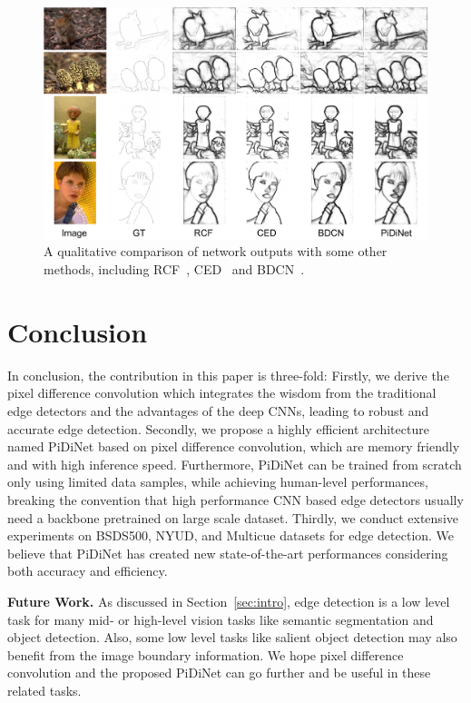 \documentclass[10pt,twocolumn,letterpaper]{article}
\begin{document}
\begin{figure}[t!]
    \centering
    \includegraphics[width=1\linewidth]{images/vis3.pdf}
    \caption{A qualitative comparison of network outputs with some other methods, including RCF~\cite{liu2019richer}, CED~\cite{wang2017ced} and BDCN~\cite{he2019bidirectional}.}
    \label{fig:bsds_visualization}
\end{figure}


\section{Conclusion}
In conclusion, the contribution in this paper is three-fold: Firstly, we derive the pixel difference convolution which integrates the wisdom from the traditional edge detectors and the advantages of the deep CNNs, leading to robust and accurate edge detection. Secondly, we propose a highly efficient architecture named PiDiNet based on pixel difference convolution, which are memory friendly and with high inference speed. Furthermore, PiDiNet can be trained from scratch only using limited data samples, while achieving human-level performances, breaking the convention that high performance CNN based edge detectors usually need a backbone pretrained on large scale dataset. Thirdly, we conduct extensive experiments on BSDS500, NYUD, and Multicue datasets for edge detection. We believe that PiDiNet has created new state-of-the-art performances considering both accuracy and efficiency.

\vspace{0.5em}
\noindent \textbf{Future Work.} \quad As discussed in Section~\ref{sec:intro}, edge detection is a low level task for many mid- or high-level vision tasks like semantic segmentation and object detection. Also, some low level tasks like salient object detection may also benefit from the image boundary information. We hope pixel difference convolution and the proposed PiDiNet can go further and be useful in these related tasks. 
\end{document}
